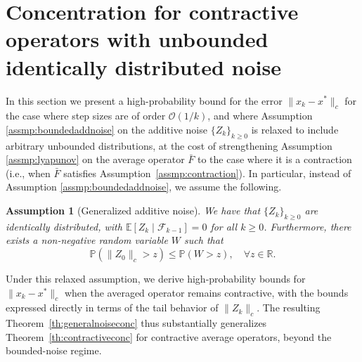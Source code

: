 \documentclass{article}
\newcommand{\todoS}[1]{\todo[inline, color=cyan!20!white]{#1}}
\newcommand{\lrp}[1]{\left( #1 \right)}
\newcommand{\R}{\mathbb{R}}
\newcommand{\xk}{x_k}
\newtheorem{assmp}{Assumption}
\begin{document}
\section{Concentration for contractive operators with unbounded identically distributed noise}\label{sec:generalcontractive}
In this section we present a high-probability bound for the error $\|\xk - x^*\|_c$ for the case where step sizes are of order $\mathcal{O}(1/k)$, and where Assumption \ref{assmp:boundedaddnoise} on the additive noise $\{Z_k\}_{k \geq 0}$ is relaxed to include arbitrary unbounded distributions, at the cost of strengthening Assumption \ref{assmp:lyapunov} on the average operator $\bar{F}$ to the case where it is a contraction (i.e., when $\bar{F}$ satisfies Assumption~\ref{assmp:contraction}).
In particular, instead of Assumption \ref{assmp:boundedaddnoise}, we assume the following.

\begin{assmp}[Generalized additive noise]\label{assmp:addnoise} We have that $\{Z_k\}_{k\geq 0}$ are identically distributed, with $\mathbb{E}[Z_k\mid \mathcal{F}_{k-1}] = 0$ for all $k\geq 0$. Furthermore, there exists a non-negative random variable $W$ such that
\[ \mathbb{P}\lrp{ \|Z_0\|_c > z } \le \mathbb{P}\lrp{W > z}, \quad \forall z\in\R.  \]
\end{assmp}

Under this relaxed assumption, we derive high-probability bounds for $\|\xk - x^*\|_c$ when the averaged operator remains contractive, with the bounds expressed directly in terms of the tail behavior of $\|Z_k\|_c$. The resulting Theorem~\ref{th:generalnoiseconc} thus substantially generalizes Theorem~\ref{th:contractiveconc} for contractive average operators, beyond the bounded-noise regime.

\end{document}
